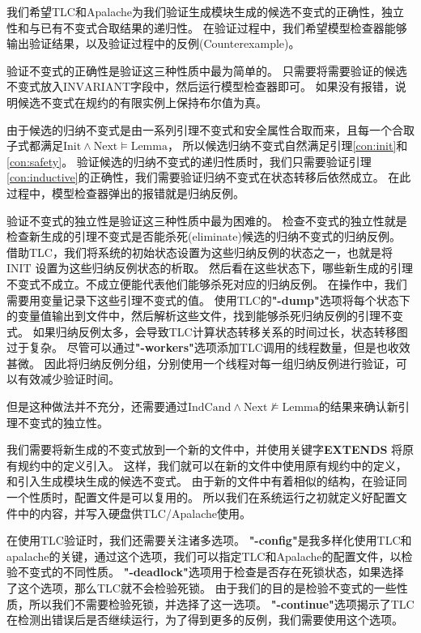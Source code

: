 我们希望TLC和Apalache为我们验证生成模块生成的候选不变式的正确性，独立性和与已有不变式合取结果的递归性。
在验证过程中，我们希望模型检查器能够输出验证结果，以及验证过程中的反例(Counterexample)。

验证不变式的正确性是验证这三种性质中最为简单的。
只需要将需要验证的候选不变式放入$\text{INVARIANT}$字段中，然后运行模型检查器即可。
如果没有报错，说明候选不变式在规约的有限实例上保持布尔值为真。

由于候选的归纳不变式是由一系列引理不变式和安全属性合取而来，且每一个合取子式都满足$\text{Init} \wedge \text{Next} \vDash \text{Lemma}$，
所以候选归纳不变式自然满足引理\ref{con:init}和\ref{con:safety}。
验证候选的归纳不变式的递归性质时，我们只需要验证引理\ref{con:inductive}的正确性，我们需要验证归纳不变式在状态转移后依然成立。
在此过程中，模型检查器弹出的报错就是归纳反例。

验证不变式的独立性是验证这三种性质中最为困难的。
检查不变式的独立性就是检查新生成的引理不变式是否能杀死(eliminate)候选的归纳不变式的归纳反例。
借助TLC，我们将系统的初始状态设置为这些归纳反例的状态之一，也就是将$\text{INIT}$ 设置为这些归纳反例状态的析取。
然后看在这些状态下，哪些新生成的引理不变式不成立。不成立便能代表他们能够杀死对应的归纳反例。
在操作中，我们需要用变量记录下这些引理不变式的值。
使用TLC的\textbf{"-dump"}选项将每个状态下的变量值输出到文件中，然后解析这些文件，找到能够杀死归纳反例的引理不变式。
如果归纳反例太多，会导致TLC计算状态转移关系的时间过长，状态转移图过于复杂。
尽管可以通过\textbf{"-workers"}选项添加TLC调用的线程数量，但是也收效甚微。
因此将归纳反例分组，分别使用一个线程对每一组归纳反例进行验证，可以有效减少验证时间。

但是这种做法并不充分，还需要通过$\text{IndCand} \wedge \text{Next} \nvDash \text{Lemma}$的结果来确认新引理不变式的独立性。

我们需要将新生成的不变式放到一个新的文件中，并使用关键字\textbf{EXTENDS} 将原有规约中的定义引入。
这样，我们就可以在新的文件中使用原有规约中的定义，和引入生成模块生成的候选不变式。
由于新的\TLA 文件中有着相似的结构，在验证同一个性质时，配置文件是可以复用的。
所以我们在系统运行之初就定义好配置文件中的内容，并写入硬盘供TLC/Apalache使用。

在使用TLC验证时，我们还需要关注诸多选项。
\textbf{"-config"}是我多样化使用TLC和apalache的关键，通过这个选项，我们可以指定TLC和Apalache的配置文件，以检验不变式的不同性质。
\textbf{"-deadlock"}选项用于检查是否存在死锁状态，如果选择了这个选项，那么TLC就不会检验死锁。
由于我们的目的是检验不变式的一些性质，所以我们不需要检验死锁，并选择了这一选项。
\textbf{"-continue"}选项揭示了TLC在检测出错误后是否继续运行，为了得到更多的反例，我们需要使用这个选项。


